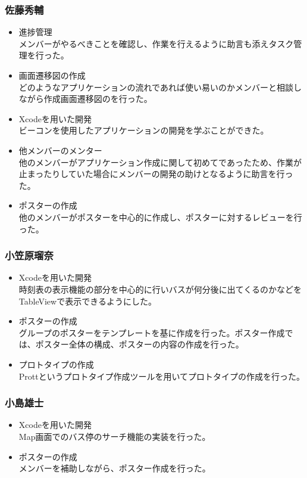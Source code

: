 \documentclass[openany,11pt,papersize]{jsbook}
\begin{document}
\subsubsection{佐藤秀輔}
\begin{itemize}
	\item 進捗管理\\
    メンバーがやるべきことを確認し、作業を行えるように助言も添えタスク管理を行った。
  \item 画面遷移図の作成\\
    どのようなアプリケーションの流れであれば使い易いのかメンバーと相談しながら作成画面遷移図のを行った。
	\item Xcodeを用いた開発\\
    ビーコンを使用したアプリケーションの開発を学ぶことができた。
  \item 他メンバーのメンター\\
    他のメンバーがアプリケーション作成に関して初めてであったため、作業が止まったりしていた場合にメンバーの開発の助けとなるように助言を行った。
  \item ポスターの作成\\
    他のメンバーがポスターを中心的に作成し、ポスターに対するレビューを行った。
\end{itemize}

\subsubsection{小笠原瑠奈}
\begin{itemize}
	\item Xcodeを用いた開発\\
    時刻表の表示機能の部分を中心的に行いバスが何分後に出てくるのかなどをTableViewで表示できるようにした。
  \item ポスターの作成\\
    グループのポスターをテンプレートを基に作成を行った。ポスター作成では、ポスター全体の構成、ポスターの内容の作成を行った。
  \item プロトタイプの作成\\
    Prottというプロトタイプ作成ツールを用いてプロトタイプの作成を行った。
\end{itemize}

\subsubsection{小島雄士}
\begin{itemize}
	\item Xcodeを用いた開発\\
    Map画面でのバス停のサーチ機能の実装を行った。
  \item ポスターの作成\\
    メンバーを補助しながら、ポスター作成を行った。
\end{itemize}
\end{document}
